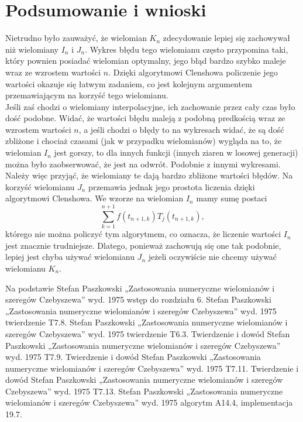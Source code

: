 \documentclass[11pt,wide]{mwart}
\begin{document}
\section{Podsumowanie i wnioski}
Nietrudno było zauważyć, że wielomian $K_n$ zdecydowanie lepiej się zachowywał niż wielomiany $I_n$ i $J_n$. Wykres błędu tego wielomianu często przypomina taki, który pownien posiadać wielomian optymalny, jego błąd bardzo szybko maleje wraz ze wzrostem wartości $n$. Dzięki algorytmowi Clenshowa policzenie jego wartości okazuje się łatwym zadaniem, co jest kolejnym argumentem przemawiającym na korzyść tego wielomianu.\\
Jeśli zaś chodzi o wielomiany interpolacyjne, ich zachowanie przez cały czas było dość podobne. Widać, że wartości błędu maleją z podobną predkością wraz ze wzrostem wartości $n$, a jeśli chodzi o błędy to na wykresach widać, że są dość zbliżone i chociaż czasami (jak w przypadku wielomianów) wygląda na to, że wielomian $I_n$ jest gorszy, to dla innych funkcji (innych ziaren w losowej generacji) można było zaobserwować, że jest na odwrót. Podobnie z innymi wykresami. Należy więc przyjąć, że wielomiany te dają bardzo zbliżone wartości błędów. Na korzyść wielomianu $J_n$ przemawia jednak jego prostota liczenia dzięki algorytmowi Clenshowa. We wzorze na wielomian $I_n$ mamy sumę postaci
\begin{equation*}
\sum_{k=1}^{n+1} f(t_{n+1, k})T_j(t_{n+1, k}),
\end{equation*}
którego nie można policzyć tym algorytmem, co oznacza, że liczenie wartości $I_n$ jest znacznie trudniejsze. Dlatego, ponieważ zachowują się one tak podobnie, lepiej jest chyba używać wielomianu $J_n$ jeżeli oczywiście nie chcemy  używać wielomianu $K_n$.

\begin{thebibliography}{99}
 Na podstawie Stefan Paszkowski „Zastosowania numeryczne wielomianów i szeregów Czebyszewa” wyd. 1975 wstęp do rozdziału 6.
 Stefan Paszkowski „Zastosowania numeryczne wielomianów i szeregów Czebyszewa” wyd. 1975 twierdzenie T7.8.
 Stefan Paszkowski „Zastosowania numeryczne wielomianów i szeregów Czebyszewa” wyd. 1975 twierdzenie T6.3.
 Twierdzenie i dowód Stefan Paszkowski „Zastosowania numeryczne wielomianów i szeregów Czebyszewa” wyd. 1975 T7.9.
 Twierdzenie i dowód Stefan Paszkowski „Zastosowania numeryczne wielomianów i szeregów Czebyszewa” wyd. 1975 T7.11.
 Twierdzenie i dowód Stefan Paszkowski „Zastosowania numeryczne wielomianów i szeregów Czebyszewa” wyd. 1975 T7.13.
 Stefan Paszkowski „Zastosowania numeryczne wielomianów i szeregów Czebyszewa” wyd. 1975 algorytm A14.4, implementacja 19.7.
\end{thebibliography}
\end{document}
